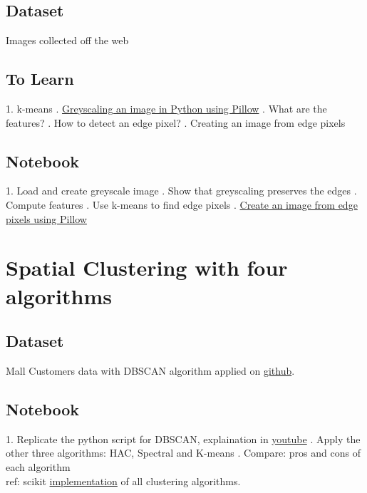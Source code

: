 \documentclass{article}
\begin{document}
\subsection*{Dataset} Images collected off the web

\subsection*{To Learn}
1. k-means
. \href{https://stackoverflow.com/questions/12201577/how-can-i-convert-an-rgb-image-into-grayscale-in-python}{Greyscaling an image in Python using Pillow}
. What are the features?
. How to detect an edge pixel?
. Creating an image from edge pixels

\subsection*{Notebook}
1. Load and create greyscale image
. Show that greyscaling preserves the edges
. Compute features
. Use k-means to find edge pixels
. \href{https://stackoverflow.com/questions/434583/what-is-the-fastest-way-to-draw-an-image-from-discrete-pixel-values-in-python}{Create an image from edge pixels using Pillow}

\section*{Spatial Clustering with four algorithms}
\subsection*{Dataset} Mall Customers data with DBSCAN algorithm applied on \href{https://github.com/krishnaik06/DBSCAN-Algorithm}{github}.

\subsection*{Notebook}
1. Replicate the python script for DBSCAN, explaination in \href{https://www.youtube.com/watch?v=C3r7tGRe2eI}{youtube}
. Apply the other three algorithms: HAC, Spectral and K-means
. Compare: pros and cons of each algorithm\\ ref: scikit \href{https://scikit-learn.org/stable/auto_examples/cluster/plot_cluster_comparison.html#sphx-glr-auto-examples-cluster-plot-cluster-comparison-py}{implementation} of all clustering algorithms.
\end{document}
